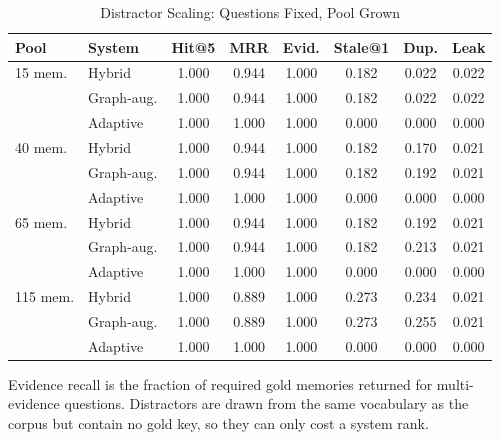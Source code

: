 \begin{table}[t]
\caption{Distractor Scaling: Questions Fixed, Pool Grown}
\label{tab:scaling}
\centering
\footnotesize
\setlength{\tabcolsep}{3.5pt}
\begin{tabular}{@{}llcccccc@{}}
\toprule
\textbf{Pool} & \textbf{System} & \textbf{Hit@5} & \textbf{MRR} & \textbf{Evid.} & \textbf{Stale@1} & \textbf{Dup.} & \textbf{Leak} \\
\midrule
15 mem. & Hybrid & 1.000 & 0.944 & 1.000 & 0.182 & 0.022 & 0.022 \\
 & Graph-aug. & 1.000 & 0.944 & 1.000 & 0.182 & 0.022 & 0.022 \\
 & Adaptive & 1.000 & 1.000 & 1.000 & 0.000 & 0.000 & 0.000 \\
40 mem. & Hybrid & 1.000 & 0.944 & 1.000 & 0.182 & 0.170 & 0.021 \\
 & Graph-aug. & 1.000 & 0.944 & 1.000 & 0.182 & 0.192 & 0.021 \\
 & Adaptive & 1.000 & 1.000 & 1.000 & 0.000 & 0.000 & 0.000 \\
65 mem. & Hybrid & 1.000 & 0.944 & 1.000 & 0.182 & 0.192 & 0.021 \\
 & Graph-aug. & 1.000 & 0.944 & 1.000 & 0.182 & 0.213 & 0.021 \\
 & Adaptive & 1.000 & 1.000 & 1.000 & 0.000 & 0.000 & 0.000 \\
115 mem. & Hybrid & 1.000 & 0.889 & 1.000 & 0.273 & 0.234 & 0.021 \\
 & Graph-aug. & 1.000 & 0.889 & 1.000 & 0.273 & 0.255 & 0.021 \\
 & Adaptive & 1.000 & 1.000 & 1.000 & 0.000 & 0.000 & 0.000 \\
\bottomrule
\end{tabular}
\par\vspace{2pt}
\raggedright\scriptsize Evidence recall is the fraction of required gold memories returned for multi-evidence questions. Distractors are drawn from the same vocabulary as the corpus but contain no gold key, so they can only cost a system rank.
\end{table}
